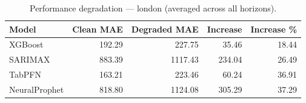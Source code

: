 \begin{table}[h]
\centering
\caption{Performance degradation — london (averaged across all horizons).}
\label{tab:degradation_summary_london}
\begin{tabular}{lrrrr}
\toprule
Model & Clean MAE & Degraded MAE & Increase & Increase \% \\
\midrule
XGBoost & 192.29 & 227.75 & 35.46 & 18.44 \\
SARIMAX & 883.39 & 1117.43 & 234.04 & 26.49 \\
TabPFN & 163.21 & 223.46 & 60.24 & 36.91 \\
NeuralProphet & 818.80 & 1124.08 & 305.29 & 37.29 \\
\bottomrule
\end{tabular}
\end{table}

